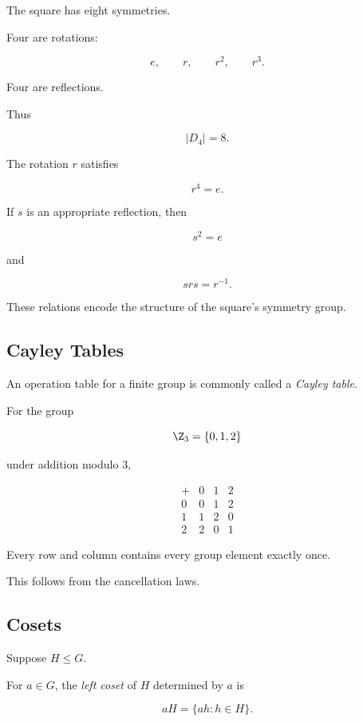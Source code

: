 The square has eight symmetries.

Four are rotations:

\[ e,\qquad r,\qquad r^2,\qquad r^3. \]

Four are reflections.

Thus

\[ |D_4|=8. \]

The rotation \(r\) satisfies

\[ r^4=e. \]

If \(s\) is an appropriate reflection, then

\[ s^2=e \]

and

\[ srs=r^{-1}. \]

These relations encode the structure of the square's symmetry group.

\subsection{Cayley Tables}
\label{subsec:cayley-tables}

An operation table for a finite group is commonly called a \emph{Cayley
table}.

For the group

\[ \Z_3=\{0,1,2\} \]

under addition modulo \(3\),

\[
\begin{array}{c|ccc}
+ & 0&1&2\\
\hline
0&0&1&2\\
1&1&2&0\\
2&2&0&1
\end{array}
\]

Every row and column contains every group element exactly once.

This follows from the cancellation laws.

\subsection{Cosets}
\label{subsec:cosets}

Suppose \(H\leq G\).

For \(a\in G\), the \emph{left coset} of \(H\) determined by \(a\) is

\[ aH=\{ah:h\in H\}. \]

